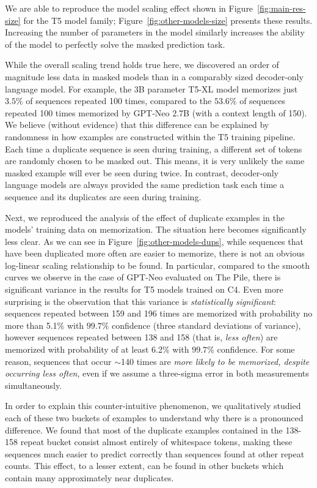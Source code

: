 %
We are able to reproduce the model scaling effect shown in Figure~\ref{fig:main-res-size} for the T5 model family;
Figure~\ref{fig:other-models-size} presents these results.
%
Increasing the number of parameters in the model similarly increases the ability of the model
to perfectly solve the masked prediction task.

While the overall scaling trend holds true here, we discovered an order of magnitude less data in masked models than in a comparably sized decoder-only language model.
%
For example, the $3$B parameter T5-XL model memorizes just $3.5\%$ of sequences repeated 100 times, compared to the $53.6\%$ of sequences repeated 100 times memorized by GPT-Neo 2.7B (with a context length of 150). 
We believe (without evidence) that this difference can be explained by randomness in how examples are constructed within the T5 training pipeline.
Each time a duplicate sequence is seen during training, a different set of tokens are randomly chosen to be masked out.
This means, it is very unlikely the same masked example will ever be seen during twice.
In contrast, decoder-only language models are always provided the same prediction task each time a sequence and its duplicates are seen during training.

Next, we reproduced the analysis of the effect of duplicate examples in the models' training data on memorization.
%
The situation here becomes significantly less clear.
%
As we can see in Figure~\ref{fig:other-models-dups}, while sequences that have been duplicated more often are easier to memorize,
there is not an obvious log-linear scaling relationship to be found.
%
In particular, compared to the smooth curves we observe in the case of GPT-Neo evaluated on The Pile,
there is significant variance in the results for T5 models trained on C4.
%
Even more surprising is the observation that this variance is \emph{statistically significant}:
sequences repeated between 159 and 196 times are memorized with probability no more than 5.1\% with $99.7\%$ confidence (three standard deviations of variance),
however sequences repeated between 138 and 158 (that is, \emph{less often}) are memorized with probability of
at least 6.2\% with $99.7\%$ confidence.
%
For some reason, sequences that occur $\sim$140 times are \emph{more likely to be memorized, despite occurring less often}, even if we assume a three-sigma error in both measurements simultaneously.

In order to explain this counter-intuitive phenomenon, we qualitatively studied each of these two buckets
of examples to understand why there is a pronounced difference.
%
We found that most of the duplicate examples contained in the 138-158 repeat bucket consist almost entirely of whitespace tokens, making these sequences much easier to predict correctly than sequences found at other repeat counts.
This effect, to a lesser extent, can be found in other buckets which contain many approximately near duplicates.

